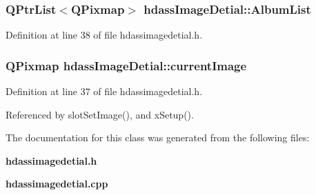 \subsubsection{\setlength{\rightskip}{0pt plus 5cm}QPtr\-List$<$QPixmap$>$ {\bf hdass\-Image\-Detial::Album\-List}}\label{classhdassImageDetial_hdassImageDetialo1}




Definition at line 38 of file hdassimagedetial.h.
\subsubsection{\setlength{\rightskip}{0pt plus 5cm}QPixmap {\bf hdass\-Image\-Detial::current\-Image}}\label{classhdassImageDetial_hdassImageDetialo0}




Definition at line 37 of file hdassimagedetial.h.

Referenced by slot\-Set\-Image(), and x\-Setup().

The documentation for this class was generated from the following files:\begin{CompactItemize}
\item 
{\bf hdassimagedetial.h}\item 
{\bf hdassimagedetial.cpp}\end{CompactItemize}
